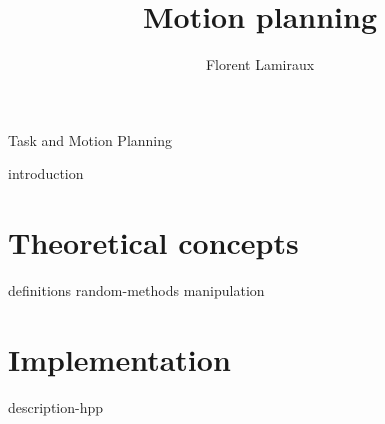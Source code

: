 \documentclass[xcolor = {svgnames,x11names}]{beamer}
\title {Motion planning}
\subtitle{}
\author[]
{Florent Lamiraux}
\institute[CNRS-LAAS] %
{
  CNRS-LAAS, Toulouse, France
}
\date[] %
{}
\begin{document}
\lstset{
breakatwhitespace=true,
breaklines=true
tabsize=3,
}

\begin{frame}
  \titlepage
\end{frame}

%
\begin{frame}{Task and Motion Planning}
\end{frame}

 {introduction}
\section{Theoretical concepts}
 {definitions}
 {random-methods}
 {manipulation}
\section{Implementation}
 {description-hpp}
\end{document}
